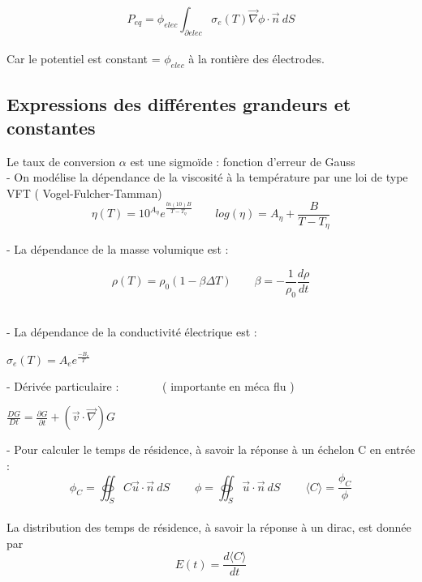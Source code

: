 \documentclass[12pt, a4paper, french, BCOR = 0pt, DIV = 10]{scrartcl}
\begin{document}
    \[ P_{eq}=\phi_{elec} \int_{\partial elec} \sigma_{e}(T)\vec \nabla\phi \cdot \vec{n}~dS\]
    \\
    Car le potentiel est constant = $\phi_{elec} $ à la rontière des électrodes. \\
    \subsection{ Expressions des différentes grandeurs et constantes}
    Le taux de conversion $\alpha$ est une sigmoïde : fonction d'erreur de Gauss\\ [0.3cm]
    
    - On modélise la dépendance de la viscosité à la température par une loi de type VFT ( Vogel-Fulcher-Tamman) \\ [0.5 cm]
    
    \centering
    $$
    \eta (T)  = 10^{A_{\eta}} e^{\frac{ln(10) B}{T-T_{\eta}}} ~~~~~~~~~ log(\eta) = A_{\eta} + \frac{B}{T-T_{\eta}}
    $$
    
    
    \raggedright
    - La dépendance de la masse volumique est : \\ [0.5 cm]
    \begin{center}
        
        
        $$
        \rho(T) = \rho_{0}  (1 - \beta \Delta T) ~~~~~~~~~ 
        \beta = -\frac{1}{\rho_{0}} \frac{d\rho}{dt}
        $$
        \\
    \end{center}
    
    
    
    - La dépendance de la conductivité électrique est : \\ [0.5 cm]
    \begin{center}
        $ 
        \sigma_{e} (T) =  A_{e} e^{\frac{-B_{e}}{T}}
        $
    \end{center}
    
    - Dérivée particulaire : ~~~~~~~( importante en méca flu )\\
    
    \begin{center}
        $ \frac{DG}{Dt}=\frac{\partial G}{\partial t} + (\vec {v} \cdot \vec {\nabla } ) G
        $ \\    
    \end{center}
    
    
    
    - Pour calculer le temps  de résidence, à savoir la réponse à un échelon C en entrée :\\ [0.5cm]
    $$
    \phi_{C} =  \oiint_S C\vec{u} \cdot \vec{n}~dS  ~~~~~~~~~~ \phi = \oiint_S \vec{u} \cdot \vec{n}~dS  ~~~~~~~~~~
    \langle C \rangle = \frac{\phi_{C}}{\phi}
    $$ 
    \\ [0.5 cm]
    La distribution des temps de résidence, à savoir la réponse à un dirac, est donnée par \[E(t)=\frac{d\langle C \rangle}{dt}\]
    
\end{document}

